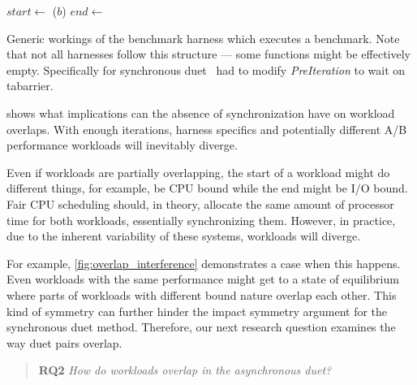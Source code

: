 \begin{algorithm}
\begin{algorithmic}
		\State {}
		 	\State {}
			\State $start \gets$ 
			\State {}($b$)
			\State $end \gets$ 
			\State {}
		\EndFor
		\State {}
		\State {}
	\EndFunction
\end{algorithmic}
\caption{
	Generic workings of the benchmark harness which executes a benchmark.
	Note that not all harnesses follow this structure --- some functions might be effectively empty.
	Specifically for synchronous duet~\citet{bulej2020duet} had to modify \emph{PreIteration} to wait on tabarrier.
}
\label{alg:harness}
\end{algorithm}

 shows what implications can the absence of synchronization have on workload overlaps.
With enough iterations, harness specifics and potentially different A/B performance workloads will inevitably diverge.

Even if workloads are partially overlapping, the start of a workload might do different things, for example, be CPU bound while the end might be I/O bound.
Fair CPU scheduling should, in theory, allocate the same amount of processor time for both workloads, essentially synchronizing them.
However, in practice, due to the inherent variability of these systems, workloads will diverge.

For example, \cref{fig:overlap_interference} demonstrates a case when this happens.
Even workloads with the same performance might get to a state of equilibrium where parts of workloads with different bound nature overlap each other.
This kind of symmetry can further hinder the impact symmetry argument for the synchronous duet method.
Therefore, our next research question examines the way duet pairs overlap.

\begin{quote}
	\textbf{RQ2} \emph{How do workloads overlap in the asynchronous duet?}
\end{quote}

